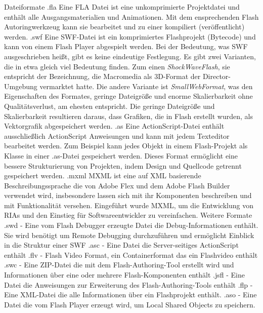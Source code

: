 Dateiformate
.fla
Eine FLA Datei ist eine unkomprimierte Projektdatei und enthält alle
Ausgangsmaterialien und Animationen. Mit dem ensprechenden Flash
Autoringwerkzeug kann sie bearbeitet und zu einer kompiliert (veröffentlicht)
werden.
.swf
Eine SWF-Datei ist ein komprimiertes Flashprojekt (Bytecode) und kann von
einem Flash Player abgespielt werden. Bei der Bedeutung, was SWF ausgeschrieben
heißt, gibt es keine eindeutige Festlegung. Es gibt zwei Varianten, die in etwa
gleich viel Bedeutung finden. Zum einen \emph{ShockWaveFlash}, sie entspricht
der Bezeichnung, die Macromedia als 3D-Format der Director-Umgebung
vermarktet hatte. Die andere Variante ist \emph{SmallWebFormat}, was den
Eigenschaften des Formates, geringe Dateigröße und enorme Skalierbarkeit ohne
Qualitätsverlust, am ehesten entspricht. Die geringe Dateigröße und
Skalierbarkeit resultieren daraus, dass Grafiken, die in Flash erstellt wurden,
als Vektorgrafik abgespeichert werden.
.as
Eine ActionScript-Datei enthält ausschließlich ActionScript Anweisungen
und kann mit jedem Texteditor bearbeitet werden. Zum Beispiel kann jedes
Objekt in einem Flash-Projekt als Klasse in einer .as-Datei gespeichert werden.
Dieses Format ermöglicht eine bessere Strukturierung von Projekten, indem
Design und Quellcode getrennt gespeichert werden.
.mxml
MXML ist eine auf XML basierende Beschreibungssprache die von Adobe Flex und
dem Adobe Flash Builder verwendet wird, insbesondere lassen sich mit ihr
Komponenten beschreiben und mit Funktionalität versehen. Eingeführt wurde
MXML, um die Entwicklung von RIAs und den Einstieg für Softwareentwickler zu
vereinfachen.
Weitere Formate
.swd - Eine vom Flash Debugger erzeugte Datei die Debug-Informationen enthält.
Sie wird benötigt um Remote Debugging durchzuführen und ermöglicht Einblick
in die Struktur einer SWF
.asc - Eine Datei die Server-seitiges ActionScript enthält
.flv - Flash Video Format, ein Containerformat das ein Flashvideo enthält
.swc - Eine ZIP-Datei die mit dem Flash-Authoring-Tool erstellt wird und
Informationen über eine oder mehrere Flash-Komponenten enthält
.jsfl - Eine Datei die Anweisungen zur Erweiterung des Flash-Authoring-Tools
enthält
.flp - Eine XML-Datei die alle Informationen über ein Flashprojekt enthält.
.aso - Eine Datei die vom Flash Player erzeugt wird, um Local Shared Objects zu
speichern.